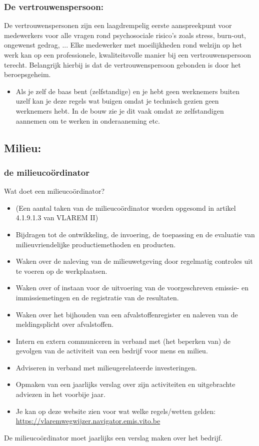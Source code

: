 \documentclass[12pt]{article}
\begin{document}
\subsubsection{De vertrouwenspersoon:}
De vertrouwenspersonen zijn een laagdrempelig eerste aanspreekpunt voor medewerkers voor
alle vragen rond psychosociale risico’s zoals stress, burn-out, ongewenst gedrag, ...
Elke medewerker met moeilijkheden rond welzijn op het werk kan op een professionele, kwaliteitsvolle manier bij een vertrouwenspersoon terecht. Belangrijk hierbij is dat de vertrouwenspersoon gebonden is door het beroepsgeheim.
\begin{itemize}
    \item Als je zelf de baas bent (zelfstandige) en je hebt geen werknemers buiten uzelf kan je deze regels wat buigen omdat je technisch gezien geen werknemers hebt. In de bouw zie je dit vaak omdat ze zelfstandigen aannemen om te werken in onderaaneming etc.
\end{itemize}
\subsection{Milieu:}
\subsubsection{de milieucoördinator}
Wat doet een milieucoördinator?\begin{itemize}
    \item[] (Een aantal taken van de milieucoördinator worden opgesomd in artikel 4.1.9.1.3 van VLAREM II)
    \item Bijdragen tot de ontwikkeling, de invoering, de toepassing en de evaluatie van milieuvriendelijke productiemethoden en producten.
    \item Waken over de naleving van de milieuwetgeving door regelmatig controles uit te voeren op de werkplaatsen. 
    \item Waken over of instaan voor de uitvoering van de voorgeschreven emissie- en immissiemetingen en de registratie van de resultaten.
    \item Waken over het bijhouden van een afvalstoffenregister en naleven van de meldingsplicht over afvalstoffen.
    \item Intern en extern communiceren in verband met (het beperken van) de gevolgen van de activiteit van een bedrijf voor mens en milieu.
    \item Adviseren in verband met milieugerelateerde investeringen.
    \item Opmaken van een jaarlijks verslag over zijn activiteiten en uitgebrachte adviezen in het voorbije jaar.
    \item[] Je kan op deze website zien voor wat welke regels/wetten gelden:
    \url{https://vlaremwegwijzer.navigator.emis.vito.be}
\end{itemize}
De milieucoördinator moet jaarlijks een verslag maken over het bedrijf.
\end{document}
